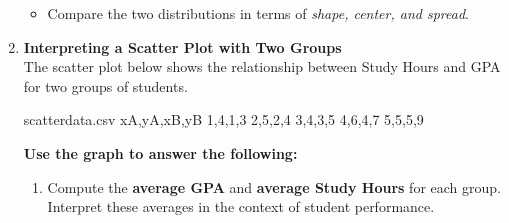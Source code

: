 \documentclass{article}
\begin{document}
\begin{enumerate}
\begin{center}
\end{center}

\begin{itemize}
  \item Compare the two distributions in terms of \emph{shape, center, and spread}.
\end{itemize}
\item \textbf{Interpreting a Scatter Plot with Two Groups} \\
The scatter plot below shows the relationship between Study Hours and GPA for two groups of students.

\begin{filecontents*}{scatterdata.csv}
xA,yA,xB,yB
1,4,1,3
2,5,2,4
3,4,3,5
4,6,4,7
5,5,5,9
\end{filecontents*}


\begin{center}
\end{center}

\textbf{Use the graph to answer the following:}
\begin{enumerate}
    \item Compute the \textbf{average GPA} and \textbf{average Study Hours} for each group. Interpret these averages in the context of student performance.


\end{enumerate}
\end{enumerate}
\end{document}
